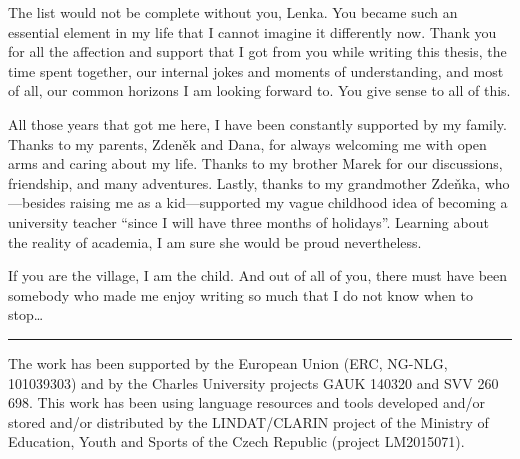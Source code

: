 \documentclass[12pt,notitlepage,a4paper,openright]{report}
\begin{document}
{    The list would not be complete without you, Lenka. You became such an essential element in my life that I cannot imagine it differently now. Thank you for all the affection and support that I got from you while writing this thesis, the time spent together, our internal jokes and moments of understanding, and most of all, our common horizons I am looking forward to. You give sense to all of this.

    All those years that got me here, I have been constantly supported by my family. Thanks to my parents, Zdeněk and Dana, for always welcoming me with open arms and caring about my life. Thanks to my brother Marek for our discussions, friendship, and many adventures. Lastly, thanks to my grandmother Zdeňka, who---besides raising me as a kid---supported my vague childhood idea of becoming a university teacher ``since I will have three months of holidays''. Learning about the reality of academia, I am sure she would be proud nevertheless.


    \vspace{1\baselineskip}
    \noindent If you are the village, I am the child. And out of all of you, there must have been somebody who made me enjoy writing so much that I do not know when to stop\ldots




}

\vfill


{\noindent\footnotesize %
    \par\noindent\rule{\textwidth}{0.4pt}
    The work has been supported by the European Union (ERC, NG-NLG, 101039303) and by the Charles University projects GAUK 140320 and SVV 260 698. This work has been using language resources and tools developed and/or stored and/or distributed by the  LINDAT/CLARIN project of the Ministry of Education, Youth and Sports of the Czech Republic (project LM2015071).
}

\cleardoublepage{}
\tableofcontents %

\cleardoublepage{}
\renewcommand{\chapterheadstartvskip}{\vspace*{-10mm}} %

%
%
\renewcommand{\thepage}{\arabic{page}}
\setcounter{page}{1}




\sloppy







\end{document}
